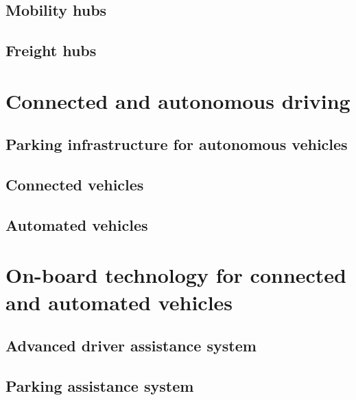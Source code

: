 \documentclass[
]{book}
\begin{document}
\hypertarget{mobility-hubs}{%
\section{Mobility hubs}\label{mobility-hubs}}

\hypertarget{freight-hubs}{%
\section{Freight hubs}\label{freight-hubs}}

\hypertarget{connected}{%
\chapter{Connected and autonomous driving}\label{connected}}

\hypertarget{parking-infrastructure-for-autonomous-vehicles}{%
\section{Parking infrastructure for autonomous vehicles}\label{parking-infrastructure-for-autonomous-vehicles}}

\hypertarget{connected-vehicles}{%
\section{Connected vehicles}\label{connected-vehicles}}

\hypertarget{automated-vehicles}{%
\section{Automated vehicles}\label{automated-vehicles}}

\hypertarget{onboard}{%
\chapter{On-board technology for connected and automated vehicles}\label{onboard}}

\hypertarget{advanced-driver-assistance-system}{%
\section{Advanced driver assistance system}\label{advanced-driver-assistance-system}}

\hypertarget{parking-assistance-system}{%
\section{Parking assistance system}\label{parking-assistance-system}}
\end{document}
